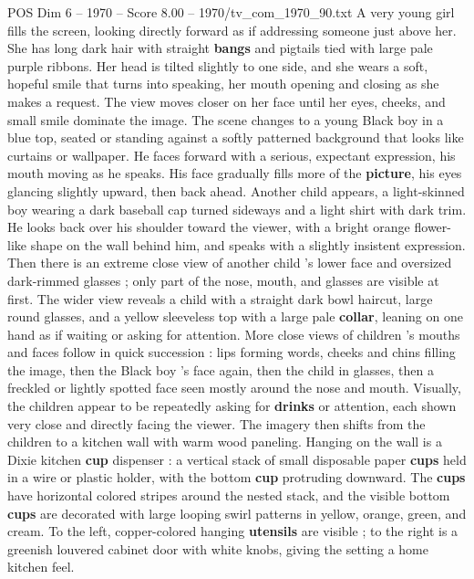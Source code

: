 \begin{textsample}{POS Dim 6 – 1970 – Score 8.00 – 1970/tv\_com\_1970\_90.txt}  \label{ex:f6_pos_049}
A very young girl fills the screen, looking directly forward as if addressing someone just above her.
She has long dark hair with straight \textbf{bangs} and pigtails tied with large pale purple ribbons.
Her head is tilted slightly to one side, and she wears a soft, hopeful smile that turns into speaking, her mouth opening and closing as she makes a request.
The view moves closer on her face until her eyes, cheeks, and small smile dominate the image.
The scene changes to a young Black boy in a blue top, seated or standing against a softly patterned background that looks like curtains or wallpaper.
He faces forward with a serious, expectant expression, his mouth moving as he speaks.
His face gradually fills more of the \textbf{picture}, his eyes glancing slightly upward, then back ahead.
Another child appears, a light-skinned boy wearing a dark baseball cap turned sideways and a light shirt with dark trim.
He looks back over his shoulder toward the viewer, with a bright orange flower-like shape on the wall behind him, and speaks with a slightly insistent expression.
Then there is an extreme close view of another child ’s lower face and oversized dark-rimmed glasses ; only part of the nose, mouth, and glasses are visible at first.
The wider view reveals a child with a straight dark bowl haircut, large round glasses, and a yellow sleeveless top with a large pale \textbf{collar}, leaning on one hand as if waiting or asking for attention.
More close views of children ’s mouths and faces follow in quick succession : lips forming words, cheeks and chins filling the image, then the Black boy ’s face again, then the child in glasses, then a freckled or lightly spotted face seen mostly around the nose and mouth.
Visually, the children appear to be repeatedly asking for \textbf{drinks} or attention, each shown very close and directly facing the viewer.
The imagery then shifts from the children to a kitchen wall with warm wood paneling.
Hanging on the wall is a Dixie kitchen \textbf{cup} dispenser : a vertical stack of small disposable paper \textbf{cups} held in a wire or plastic holder, with the bottom \textbf{cup} protruding downward.
The \textbf{cups} have horizontal colored stripes around the nested stack, and the visible bottom \textbf{cups} are decorated with large looping swirl patterns in yellow, orange, green, and cream.
To the left, copper-colored hanging \textbf{utensils} are visible ; to the right is a greenish louvered cabinet door with white knobs, giving the setting a home kitchen feel.

\end{textsample}
